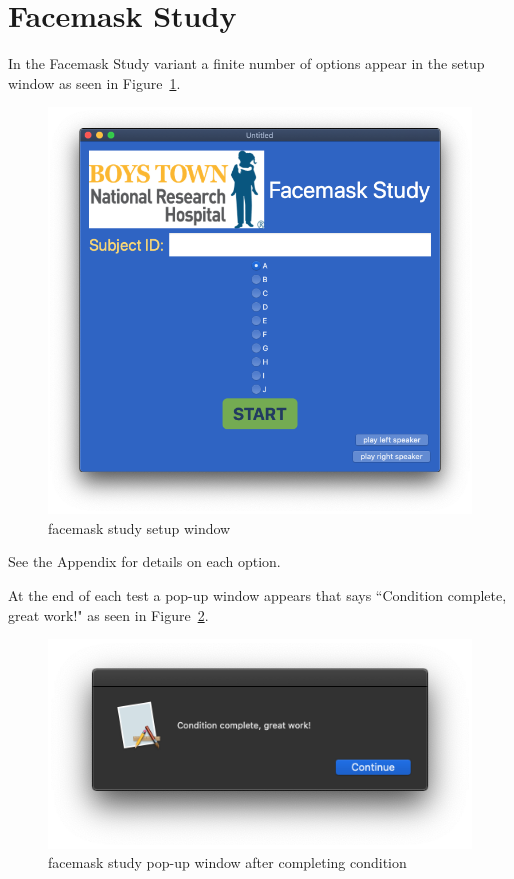 \documentclass[11pt,pdftex,letterpaper]{article}
\begin{document}
\section{Facemask Study}
In the Facemask Study variant a finite number of options appear in the setup window as seen in Figure~\ref{fig:facemask-study}.
\begin{figure}
	\centering
	\includegraphics[width = 0.9\linewidth]{facemask-study.png}
	\caption{facemask study setup window}
	\label{fig:facemask-study}
\end{figure}
See the Appendix for details on each option.

At the end of each test a pop-up window appears that says ``Condition complete, great work!" as seen in Figure~\ref{fig:facemask-condition-complete}.
\begin{figure}
	\centering
	\includegraphics[width = 0.9\linewidth]{facemask-condition-complete.png}
	\caption{facemask study pop-up window after completing condition}
	\label{fig:facemask-condition-complete}
\end{figure}
\end{document}
